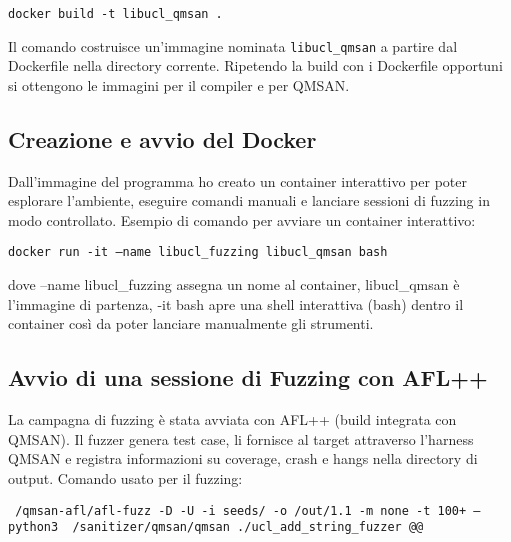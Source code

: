 \begin{center}
\texttt{docker build -t libucl\_qmsan .}
\end{center}

Il comando costruisce un’immagine nominata \texttt{libucl\_qmsan} a partire dal Dockerfile nella directory corrente. 
Ripetendo la build con i Dockerfile opportuni si ottengono le immagini per il compiler e per QMSAN.

\subsection{Creazione e avvio del Docker}

Dall’immagine del programma ho creato un container interattivo per poter esplorare l’ambiente, eseguire comandi manuali e lanciare sessioni di fuzzing in modo controllato.
Esempio di comando per avviare un container interattivo:

\begin{center}
\texttt{docker run -it --name libucl\_fuzzing\ libucl\_qmsan bash}
\end{center}

dove --name libucl\_fuzzing assegna un nome al container, libucl\_qmsan è l’immagine di partenza, -it bash apre una shell interattiva (bash) dentro il container così da poter lanciare manualmente gli strumenti.

\subsection{Avvio di una sessione di Fuzzing con AFL++}

La campagna di fuzzing è stata avviata con AFL++ (build integrata con QMSAN). Il fuzzer genera test case, li fornisce al target attraverso l’harness QMSAN e registra informazioni su coverage, crash e hangs nella directory di output.
Comando usato per il fuzzing:

\begin{center}
\texttt{~/qmsan-afl/afl-fuzz -D -U -i seeds/ -o /out/1.1 -m none -t 100+ -- python3 ~/sanitizer/qmsan/qmsan ./ucl\_add\_string\_fuzzer @@}
\end{center}

